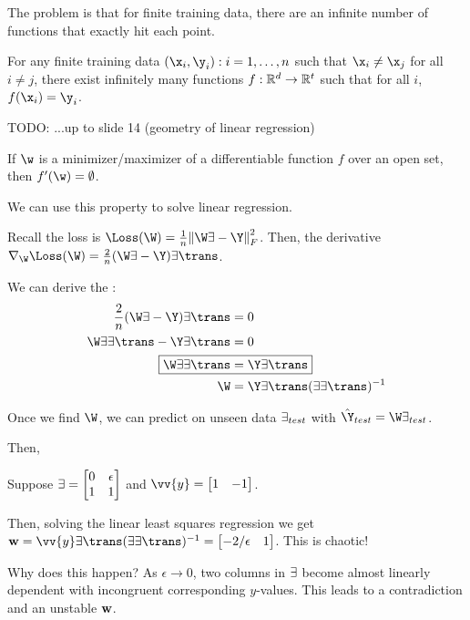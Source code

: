 \documentclass[class=cs480,notes,tikz]{agony}
\begin{document}
The problem is that for finite training data,
there are an infinite number of functions that exactly hit each point.

\begin{theorem}
  For any finite training data $(\x_i,\y_i) : {i=1,\dotsc,n}$
  such that $\x_i \neq \x_j$ for all $i \neq j$,
  there exist infinitely many functions $f : \mathbb{R}^d \to \mathbb{R}^t$ such that for all $i$,
  $f(\x_i) = \y_i$.
\end{theorem}


TODO: ...up to slide 14 (geometry of linear regression)



\begin{theorem}
  If $\w$ is a minimizer/maximizer of a differentiable function $f$
  over an open set, then $f'(\w) = \0$.
\end{theorem}

We can use this property to solve linear regression.

Recall the loss is $\Loss(\W) = \frac1n\norm{\W\X-\Y}^2_F$.
Then, the derivative $\nabla_{\W}\Loss(\W) = \frac2n(\W\X-\Y)\X\trans$.

We can derive the :
\begin{align*}
  \frac2n(\W\X-\Y)\X\trans & = 0                           \\
  \W\X\X\trans-\Y\X\trans  & = 0                           \\
  \Aboxed{\W\X\X\trans     & = \Y\X\trans}                 \\
  \W                       & = \Y\X\trans(\X\X\trans)^{-1}
\end{align*}

Once we find $\W$, we can predict on unseen data $\exists\!\,_{test}$ with $\hat{\Y}_{test} = \W\X_{test}$.

Then,

Suppose $\X = \mqty[0&\epsilon\\1&1]$ and $\vv{y} = \mqty[1&-1]$.

Then, solving the linear least squares regression we get
$\vb{w} = \vv{y}\X\trans(\X\X\trans)^{-1} = \mqty[-2/\epsilon & 1]$.
This is chaotic!

Why does this happen? As $\epsilon\to0$, two columns in $\exists\!\,$ become almost linearly dependent
with incongruent corresponding $y$-values.
This leads to a contradiction and an unstable $\vb{w}$.
\end{document}
